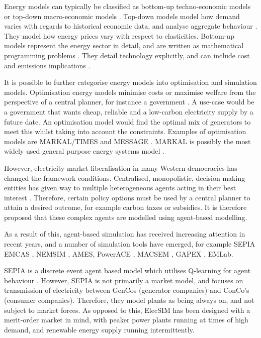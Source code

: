
Energy models can typically be classified as bottom-up techno-economic models or top-down macro-economic models \cite{Bohringer1998}. Top-down models model how demand varies with regards to historical economic data, and analyse aggregate behaviour \cite{Hall2016}. They model how energy prices vary with respect to elasticities. Bottom-up models represent the energy sector in detail, and are written as mathematical programming problems \cite{Gargiulo2013}. They detail technology explicitly, and can include cost and emissions implications \cite{Hall2016}.

It is possible to further categorise energy models into optimisation and simulation models. Optimisation energy models minimise costs or maximise welfare from the perspective of a central planner, for instance a government \cite{Keles2017}. A use-case would be a government that wants cheap, reliable and a low-carbon electricity supply by a future date. An optimisation model would find the optimal mix of generators to meet this whilst taking into account the constraints. Examples of optimisation models are MARKAL/TIMES\cite{Fishbone1981} and MESSAGE \cite{Schrattenholzer1981}. MARKAL is possibly the most widely used general purpose energy systems model \cite{Pfenninger2014}.

However, electricity market liberalisation in many Western democracies has changed the framework conditions. Centralised, monopolistic, decision making entities has given way to multiple heterogeneous agents acting in their best interest \cite{Most2010}. Therefore, certain policy options must be used by a central planner to attain a desired outcome, for example carbon taxes or subsidies. It is therefore proposed that these complex agents are modelled using agent-based modelling.

As a result of this, agent-based simulation has received increasing attention in recent years, and a number of simulation tools have emerged, for example SEPIA\cite{Kraan2018} EMCAS \cite{Conzelmann}, NEMSIM \cite{Batten2006}, AMES\cite{Sun2007}, PowerACE \cite{Rothengatter2007}, MACSEM \cite{Praca2003}, GAPEX  \cite{Cincotti2013}, EMLab\cite{Chappin2017}.

SEPIA is a discrete event agent based model which utilises Q-learning for agent behaviour \cite{Harp2000}. However, SEPIA is not primarily a market model, and focuses on transmission of electricity between GenCos (generator companies) and ConCo's (consumer companies). Therefore, they model plants as being always on, and not subject to market forces. As opposed to this, ElecSIM has been designed with a merit-order market in mind, with peaker power plants running at times of high demand, and renewable energy supply running intermittently.

